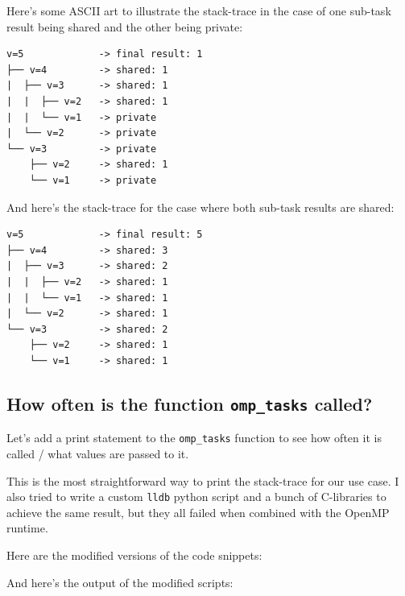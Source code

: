 \documentclass[a4paper,%
7pt,%
DIV12,
headsepline,%
headings=normal,
]{scrartcl}
\begin{document}
Here's some ASCII art to illustrate the stack-trace in the case of one sub-task result being shared and the other being private:

\begin{verbatim}
v=5             -> final result: 1
├── v=4         -> shared: 1
|  ├── v=3      -> shared: 1
|  |  ├── v=2   -> shared: 1
|  |  └── v=1   -> private
|  └── v=2      -> private
└── v=3         -> private
    ├── v=2     -> shared: 1
    └── v=1     -> private
\end{verbatim}

And here's the stack-trace for the case where both sub-task results are shared:

\begin{verbatim}
v=5             -> final result: 5
├── v=4         -> shared: 3
|  ├── v=3      -> shared: 2
|  |  ├── v=2   -> shared: 1
|  |  └── v=1   -> shared: 1
|  └── v=2      -> shared: 1
└── v=3         -> shared: 2
    ├── v=2     -> shared: 1
    └── v=1     -> shared: 1
\end{verbatim}

\subsection{How often is the function \texttt{omp\_tasks} called?}

Let's add a print statement to the \texttt{omp\_tasks} function to see how often it is called / what values are passed to it.

This is the most straightforward way to print the stack-trace for our use case. I also tried to write a custom \texttt{lldb} python script and a bunch of C-libraries to achieve the same result, but they all failed when combined with the OpenMP runtime.

Here are the modified versions of the code snippets:







And here's the output of the modified scripts:
\end{document}
